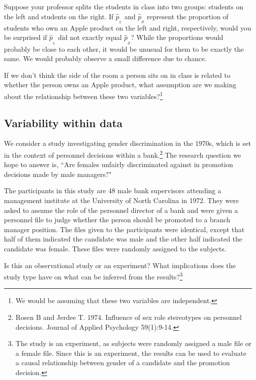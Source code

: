
\begin{example}{Suppose your professor splits the students in class into two groups: students on the left and students on the right. If $\hat{p}_{_L}$ and $\hat{p}_{_R}$ represent the proportion of students who own an Apple product on the left and right, respectively, would you be surprised if $\hat{p}_{_L}$ did not {exactly} equal $\hat{p}_{_R}$?}\label{classRightLeftSideApple}
While the proportions would probably be close to each other, it would be unusual for them to be exactly the same. We would probably observe a small difference due to {chance}.
\end{example}

\begin{exercise}
If we don't think the side of the room a person sits on in class is related to whether the person owns an Apple product, what assumption are we making about the relationship between these two variables?\footnote{We would be assuming that these two variables are independent.}
\end{exercise}

\subsection{Variability within data}
\label{variabilityWithinData}

We consider a study investigating gender discrimination in the 1970s, which is set in the context of personnel decisions within a bank.\footnote{Rosen B and Jerdee T. 1974. Influence of sex role stereotypes on personnel decisions. Journal of Applied Psychology 59(1):9-14.} The research question we hope to answer is, ``Are females unfairly discriminated against in promotion decisions made by male managers?"

The participants in this study are 48 male bank supervisors attending a management institute at the University of North Carolina in 1972. They were asked to assume the role of the personnel director of a bank and were given a personnel file to judge whether the person should be promoted to a branch manager position. The files given to the participants were identical, except that half of them indicated the candidate was male and the other half indicated the candidate was female. These files were randomly assigned to the subjects.

\begin{exercise}
Is this an observational study or an experiment? What implications does the study type have on what can be inferred from the results?\footnote{The study is an experiment, as subjects were randomly assigned a male file or a female file. Since this is an experiment, the results can be used to evaluate a causal relationship between gender of a candidate and the promotion decision.}
\end{exercise}

